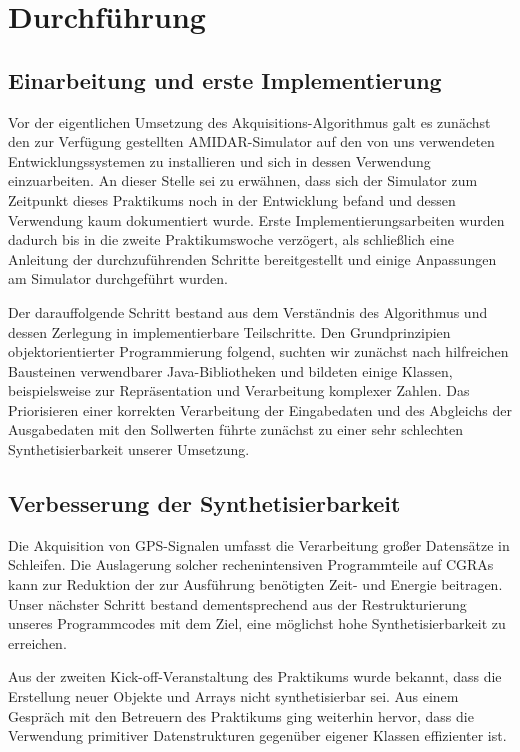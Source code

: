 \documentclass[parskip,
							 oneside,
							 11pt,
							 noheadingspace,
							 accentcolor=tud1d,
							 bigchapter,
							 colorback]{tudreport}
\begin{document}
\chapter{Durchführung}
\section{Einarbeitung und erste Implementierung}
Vor der eigentlichen Umsetzung des Akquisitions-Algorithmus galt es zunächst den zur Verfügung gestellten AMIDAR-Simulator auf den von uns verwendeten Entwicklungssystemen zu installieren und sich in dessen Verwendung einzuarbeiten. An dieser Stelle sei zu erwähnen, dass sich der Simulator zum Zeitpunkt dieses Praktikums noch in der Entwicklung befand und dessen Verwendung kaum dokumentiert wurde. Erste Implementierungsarbeiten wurden dadurch bis in die zweite Praktikumswoche verzögert, als schließlich eine Anleitung der durchzuführenden Schritte bereitgestellt und einige Anpassungen am Simulator durchgeführt wurden.

Der darauffolgende Schritt bestand aus dem Verständnis des Algorithmus und dessen Zerlegung in implementierbare Teilschritte. Den Grundprinzipien objektorientierter Programmierung folgend, suchten wir zunächst nach hilfreichen Bausteinen verwendbarer Java-Bibliotheken und bildeten einige Klassen, beispielsweise zur Repräsentation und Verarbeitung komplexer Zahlen.
Das Priorisieren einer korrekten Verarbeitung der Eingabedaten und des Abgleichs der Ausgabedaten mit den Sollwerten führte zunächst zu einer sehr schlechten Synthetisierbarkeit unserer Umsetzung.

\section{Verbesserung der Synthetisierbarkeit}
Die Akquisition von GPS-Signalen umfasst die Verarbeitung großer Datensätze in Schleifen. Die Auslagerung solcher rechenintensiven Programmteile auf CGRAs kann zur Reduktion der zur Ausführung benötigten Zeit- und Energie beitragen. Unser nächster Schritt bestand dementsprechend aus der Restrukturierung unseres Programmcodes mit dem Ziel, eine möglichst hohe Synthetisierbarkeit zu erreichen. 

Aus der zweiten Kick-off-Veranstaltung des Praktikums wurde bekannt, dass die Erstellung neuer Objekte und Arrays nicht synthetisierbar sei. Aus einem Gespräch mit den Betreuern des Praktikums ging weiterhin hervor, dass die Verwendung primitiver Datenstrukturen gegenüber eigener Klassen effizienter ist. 
\end{document}
